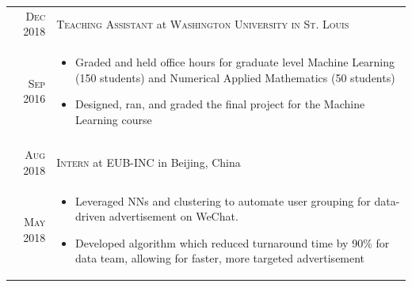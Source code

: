 \documentclass[a4paper,10pt]{article}
\begin{document}
\begin{tabular}{r|p{11cm}}
 \textsc{Dec 2018} & \textsc{Teaching Assistant} at \textsc{Washington University in St. Louis}\\
 \textsc{Sep 2016} & \small{\vspace{-10pt}\begin{itemize}
 \item Graded and held office hours for graduate level Machine Learning (150 students) and Numerical Applied Mathematics (50 students)
 \item Designed, ran, and graded the final project for the Machine Learning course\end{itemize}\vspace{-15pt}}\\\multicolumn{2}{c}{} \\
 \textsc{Aug 2018} & \textsc{Intern} at \textsc{EUB-INC} in Beijing, China\\
 \textsc{May 2018} & \small{\vspace{-10pt}\begin{itemize}
 \item Leveraged NNs and clustering to automate user grouping for data-driven advertisement on WeChat. 
 \item Developed algorithm which reduced turnaround time by 90\% for data team, allowing for faster, more targeted advertisement\end{itemize}\vspace{-15pt}}\\
\end{tabular}
\end{document}
